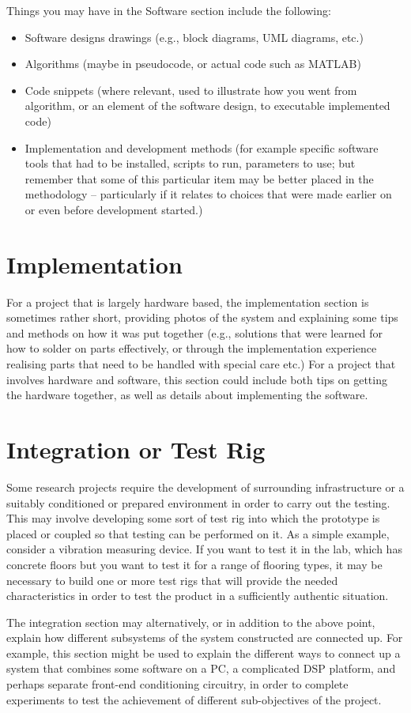 Things you may have in the Software section include the following:

\begin{itemize}
  \item Software designs drawings (e.g., block diagrams, UML diagrams, etc.)
  \item Algorithms (maybe in pseudocode, or actual code such as MATLAB)
  \item Code snippets (where relevant, used to illustrate how you went from algorithm, or an element of the software design, to executable implemented code)
  \item Implementation and development methods (for example specific software tools that had to be installed, scripts to run, parameters to use; but remember that some of this particular item may be better placed in the methodology -- particularly if it relates to choices that were made earlier on or even before development started.)
\end{itemize}

\section{Implementation}

For a project that is largely hardware based, the implementation section is sometimes rather short, providing photos of the system and explaining some tips and methods on how it was put together (e.g., solutions that were learned for how to solder on parts effectively, or through the implementation experience realising parts that need to be handled with special care etc.) For a project that involves hardware and software, this section could include both tips on getting the hardware together, as well as details about implementing the software.

\section{Integration or Test Rig}

Some research projects require the development of surrounding infrastructure or a suitably conditioned or prepared environment in order to carry out the testing. This may involve developing some sort of test rig into which the prototype is placed or coupled so that testing can be performed on it.  As a simple example, consider a vibration measuring device. If you want to test it in the lab, which has concrete floors but you want to test it for a range of flooring types, it may be necessary to build one or more test rigs that will provide the needed characteristics in order to test the product in a sufficiently authentic situation.

The integration section may alternatively, or in addition to the above point, explain how different subsystems of the system constructed are connected up.  For example, this section might be used to explain the different ways to connect up a system that combines some software on a PC, a complicated DSP platform, and perhaps separate front-end conditioning circuitry, in order to complete experiments to test the achievement of different sub-objectives of the project.
